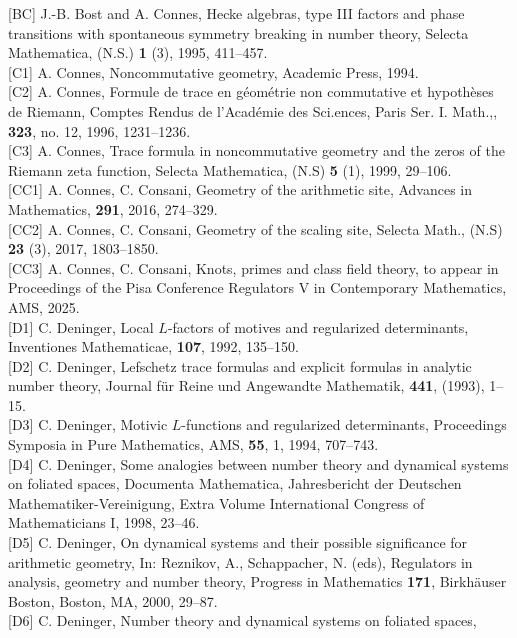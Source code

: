 \documentclass[12pt, leqno]{article}
\begin{document}
\begin{flushleft}
{[BC]} J.-B. Bost and A. Connes, Hecke algebras, type III factors and phase transitions with spontaneous symmetry breaking in number theory, Selecta Mathematica, (N.S.) {\bf 1} (3),  1995, 411--457. \\
{[C1]}  A.  Connes, Noncommutative geometry, Academic Press, 1994.\\
{[C2]} A. Connes, Formule de trace en g\'{e}om\'{e}trie non commutative et hypoth\`{e}ses de Riemann, Comptes Rendus de l'Acad\'{e}mie des Sci.ences, Paris Ser. I.  Math.,, {\bf 323}, no. 12,  1996, 1231--1236.\\
{[C3]} A. Connes, Trace formula in noncommutative geometry and the zeros of the Riemann zeta function, Selecta Mathematica, (N.S) {\bf 5} (1), 1999, 29--106. \\
{[CC1]} A. Connes, C. Consani, Geometry of the arithmetic site, Advances in  Mathematics, {\bf 291}, 2016, 274--329.\\
{[CC2]} A. Connes, C. Consani, Geometry of the scaling site, Selecta Math., (N.S) {\bf 23} (3), 2017, 1803--1850.\\
{[CC3]} A. Connes, C. Consani, Knots, primes and class field theory, to appear  in  Proceedings of the Pisa Conference Regulators V in Contemporary Mathematics, AMS, 2025. \\
{[D1]} C. Deninger, Local $L$-factors of motives and regularized determinants, Inventiones Mathematicae, {\bf 107}, 1992, 135--150.\\
{[D2]} C. Deninger, Lefschetz trace formulas and explicit formulas in analytic number theory, Journal f\"{u}r Reine und Angewandte Mathematik, {\bf 441}, (1993), 1--15.\\
{[D3]} C. Deninger, Motivic $L$-functions and regularized determinants, Proceedings Symposia in Pure Mathematics, AMS, {\bf 55}, 1, 1994, 707--743.\\
{[D4]} C. Deninger, Some analogies between number theory and dynamical 
systems on foliated spaces, Documenta Mathematica, Jahresbericht der Deutschen Mathematiker-Vereinigung, Extra Volume International Congress of Mathematicians I,  
1998, 23--46.\\
{[D5]} C. Deninger, On dynamical systems and their possible significance for
arithmetic geometry, In: Reznikov, A., Schappacher, N. (eds), Regulators in analysis, geometry and number
theory, Progress in  Mathematics {\bf 171}, Birkh\"{a}user Boston, Boston, MA, 2000, 29--87.\\
{[D6]} C. Deninger, Number theory and dynamical systems on foliated spaces,

\end{flushleft}
\end{document}
